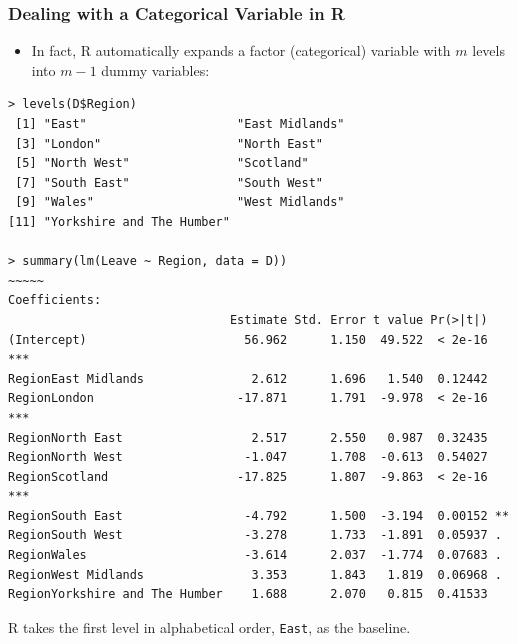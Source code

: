 \documentclass[xcolor=svgnames,9pt,english,aspectratio=169,t]{beamer}
\begin{document}
\begin{frame}[fragile]
\frametitle{Dealing with a Categorical Variable in R}
\small
{}
\begin{itemize}
  \item In fact, R automatically expands a factor (categorical) variable with $m$ levels into $m-1$ dummy variables:
\end{itemize}

\begin{Verbatim}[fontsize=\scriptsize, frame=single, label=R Code, commandchars=\\\{\}]
> levels(D$Region)
 [1] "East"                     "East Midlands"
 [3] "London"                   "North East"
 [5] "North West"               "Scotland"
 [7] "South East"               "South West"
 [9] "Wales"                    "West Midlands"
[11] "Yorkshire and The Humber"

> summary(lm(Leave ~ Region, data = D))
~~~~~
Coefficients:
                               Estimate Std. Error t value Pr(>|t|)
(Intercept)                      56.962      1.150  49.522  < 2e-16 ***
RegionEast Midlands               2.612      1.696   1.540  0.12442
RegionLondon                    -17.871      1.791  -9.978  < 2e-16 ***
RegionNorth East                  2.517      2.550   0.987  0.32435
RegionNorth West                 -1.047      1.708  -0.613  0.54027
RegionScotland                  -17.825      1.807  -9.863  < 2e-16 ***
RegionSouth East                 -4.792      1.500  -3.194  0.00152 **
RegionSouth West                 -3.278      1.733  -1.891  0.05937 .
RegionWales                      -3.614      2.037  -1.774  0.07683 .
RegionWest Midlands               3.353      1.843   1.819  0.06968 .
RegionYorkshire and The Humber    1.688      2.070   0.815  0.41533
\end{Verbatim}
\smallskip
R takes the first level in alphabetical order, \texttt{East}, as the baseline.
\end{frame}
\end{document}
